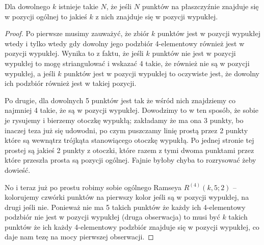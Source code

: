  \begin{theorem}
      Dla dowolnego $k$ istnieje takie $N$, że jeśli $N$ punktów na płaszczyźnie znajduje się w pozycji ogólnej to jakieś $k$ z nich znajduje się w pozycji wypukłej. 
  \end{theorem}
  \begin{proof}
    Po pierwsze musimy zauważyć, że zbiór $k$ punktów jest w pozycji wypukłej wtedy i tylko wtedy gdy dowolny jego podzbiór 4-elementowy również jest w pozycji wypukłej. Wynika to z faktu, że jeśli $k$ punktów nie jest w pozycji wypukłej to mogę striangulować i wskazać 4 takie, że również nie są w pozycji wypukłej, a jeśli $k$ punktów jest w pozycji wypukłej to oczywiste jest, że dowolny ich podzbiór również jest w takiej pozycji.

    Po drugie, dla dowolnych 5 punktów jest tak że wśród nich znajdziemy co najmniej 4 takie, że są w pozycji wypukłej. Dowodzimy to w ten sposób, że sobie je rysujemy i bierzemy otoczkę wypukłą; zakładamy że ma ona 3 punkty, bo inaczej teza już się udowodni, po czym puszczamy linię prostą przez 2 punkty które są wewnątrz trójkąta stanowiącego otoczkę wypukłą. Po jednej stronie tej prostej są jakieś 2 punkty z otoczki, które razem z tymi dwoma punktami przez które przeszła prosta są pozycji ogólnej. Fajnie byłoby chyba to rozrysować żeby dowieść. 

    No i teraz już po prostu robimy sobie ogólnego Ramseya $R^{(4)}(k,5;2)$ -- kolorujemy czwórki punktów na pierwszy kolor jeśli są w pozycji wypukłej, na drugi jeśli nie. Ponieważ nie ma 5 takich punktów że każdy ich 4-elementowy podzbiór nie jest w pozycji wypukłej (druga obserwacja) to musi być $k$ takich punktów że ich każdy 4-elementowy podzbiór znajduje się w pozycji wypukłej, co daje nam tezę na mocy pierwszej obserwacji. 
  \end{proof}